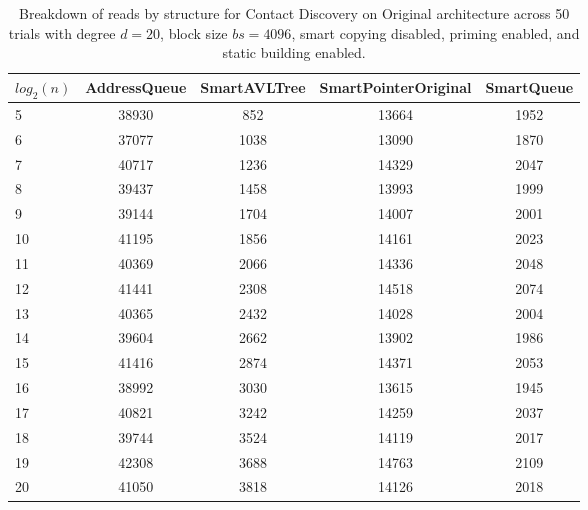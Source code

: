 \begin{table}[]
\centering
\begin{tabular}{|l|c|c|c|c|}
$log_2(n)$ & AddressQueue & SmartAVLTree & SmartPointerOriginal & SmartQueue \\ \hline
5 & 38930 & 852 & 13664 & 1952 \\ \hline
6 & 37077 & 1038 & 13090 & 1870 \\ \hline
7 & 40717 & 1236 & 14329 & 2047 \\ \hline
8 & 39437 & 1458 & 13993 & 1999 \\ \hline
9 & 39144 & 1704 & 14007 & 2001 \\ \hline
10 & 41195 & 1856 & 14161 & 2023 \\ \hline
11 & 40369 & 2066 & 14336 & 2048 \\ \hline
12 & 41441 & 2308 & 14518 & 2074 \\ \hline
13 & 40365 & 2432 & 14028 & 2004 \\ \hline
14 & 39604 & 2662 & 13902 & 1986 \\ \hline
15 & 41416 & 2874 & 14371 & 2053 \\ \hline
16 & 38992 & 3030 & 13615 & 1945 \\ \hline
17 & 40821 & 3242 & 14259 & 2037 \\ \hline
18 & 39744 & 3524 & 14119 & 2017 \\ \hline
19 & 42308 & 3688 & 14763 & 2109 \\ \hline
20 & 41050 & 3818 & 14126 & 2018 \\ \hline
\end{tabular}
\caption{Breakdown of reads by structure for Contact Discovery on Original architecture across 50 trials with degree $d=20$, block size $bs=4096$, smart copying disabled, priming enabled, and static building enabled.}
    \label{tab:reads_by_structure_cd_d20_bs4096_trials50_copiesfalse_primetrue_staticinsertiontrue_ptoriginal_movefalse}
\end{table}

